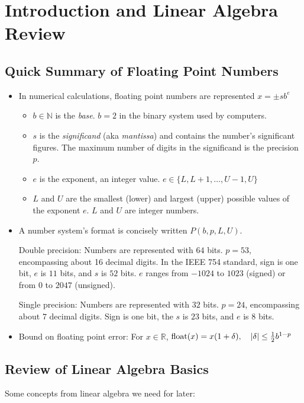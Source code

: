 \documentclass[11pt, a4paper]{article}
\newcommand{\R}{\mathbb{R}} %
\begin{document}
\section{Introduction and Linear Algebra Review}

\subsection{Quick Summary of Floating Point Numbers}
\begin{itemize}
	\item In numerical calculations, floating point numbers are represented $ x = \pm s b^{e} $
	\begin{itemize}
		\item $ b \in \mathbb{N}$ is the \textit{base}. $ b = 2 $ in the binary system used by computers.
		\item $ s $ is the \textit{significand} (aka \textit{mantissa}) and contains the number's significant figures. The maximum number of digits in the significand is the precision $ p $.

		\item $ e $ is the exponent, an integer value. $ e \in \{L, L+1, \dots, U-1, U \} $
		
		\item $ L $ and $ U $ are the smallest (lower) and largest (upper) possible values of the exponent $ e $. $ L $ and $ U $ are integer numbers.
	\end{itemize}
	
	\item A number system's format is concisely written $ P(b, p, L, U) $. 
	
	Double precision: Numbers are represented with $ 64 $ bits. $ p = 53 $, encompassing about 16 decimal digits. In the IEEE 754 standard, sign is one bit, $ e $ is $ 11 $ bits, and $ s $ is $ 52 $ bits. $ e $ ranges from $ -1024 $ to $ 1023 $ (signed) or from $ 0 $ to $ 2047 $ (unsigned).
	
	Single precision: Numbers are represented with $ 32 $ bits.	$ p = 24 $, encompassing about $ 7 $ decimal digits. Sign is one bit, the $ s $ is $ 23 $ bits, and $ e $ is 8 bits.
	
	\item Bound on floating point error: For $ x \in \R $, $ \operatorname{float}(x) = x(1 + \delta), \quad \abs{\delta} \leq \frac{1}{2} b^{1-p} $
\end{itemize}



\subsection{Review of Linear Algebra Basics}
Some concepts from linear algebra we need for later:
\end{document}
